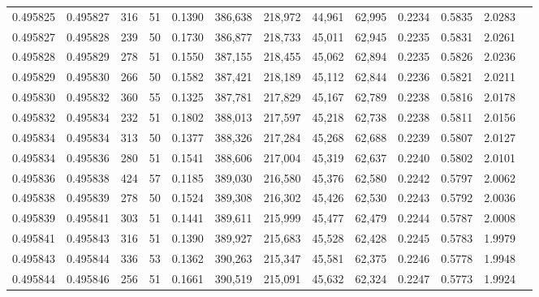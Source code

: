 \begin{tabular}{rrrrrrrrrrrrr}
0.495825 & 0.495827 &   316 &  51 &                                     0.1390 & 386,638 & 218,972 &  44,961 &  62,995 & 0.2234 & 0.5835 & 2.0283 \\
0.495827 & 0.495828 &   239 &  50 &                                     0.1730 & 386,877 & 218,733 &  45,011 &  62,945 & 0.2235 & 0.5831 & 2.0261 \\
0.495828 & 0.495829 &   278 &  51 &                                     0.1550 & 387,155 & 218,455 &  45,062 &  62,894 & 0.2235 & 0.5826 & 2.0236 \\
0.495829 & 0.495830 &   266 &  50 &                                     0.1582 & 387,421 & 218,189 &  45,112 &  62,844 & 0.2236 & 0.5821 & 2.0211 \\
0.495830 & 0.495832 &   360 &  55 &                                     0.1325 & 387,781 & 217,829 &  45,167 &  62,789 & 0.2238 & 0.5816 & 2.0178 \\
0.495832 & 0.495834 &   232 &  51 &                                     0.1802 & 388,013 & 217,597 &  45,218 &  62,738 & 0.2238 & 0.5811 & 2.0156 \\
0.495834 & 0.495834 &   313 &  50 &                                     0.1377 & 388,326 & 217,284 &  45,268 &  62,688 & 0.2239 & 0.5807 & 2.0127 \\
0.495834 & 0.495836 &   280 &  51 &                                     0.1541 & 388,606 & 217,004 &  45,319 &  62,637 & 0.2240 & 0.5802 & 2.0101 \\
0.495836 & 0.495838 &   424 &  57 &                                     0.1185 & 389,030 & 216,580 &  45,376 &  62,580 & 0.2242 & 0.5797 & 2.0062 \\
0.495838 & 0.495839 &   278 &  50 &                                     0.1524 & 389,308 & 216,302 &  45,426 &  62,530 & 0.2243 & 0.5792 & 2.0036 \\
0.495839 & 0.495841 &   303 &  51 &                                     0.1441 & 389,611 & 215,999 &  45,477 &  62,479 & 0.2244 & 0.5787 & 2.0008 \\
0.495841 & 0.495843 &   316 &  51 &                                     0.1390 & 389,927 & 215,683 &  45,528 &  62,428 & 0.2245 & 0.5783 & 1.9979 \\
0.495843 & 0.495844 &   336 &  53 &                                     0.1362 & 390,263 & 215,347 &  45,581 &  62,375 & 0.2246 & 0.5778 & 1.9948 \\
0.495844 & 0.495846 &   256 &  51 &                                     0.1661 & 390,519 & 215,091 &  45,632 &  62,324 & 0.2247 & 0.5773 & 1.9924 \\

\end{tabular}
